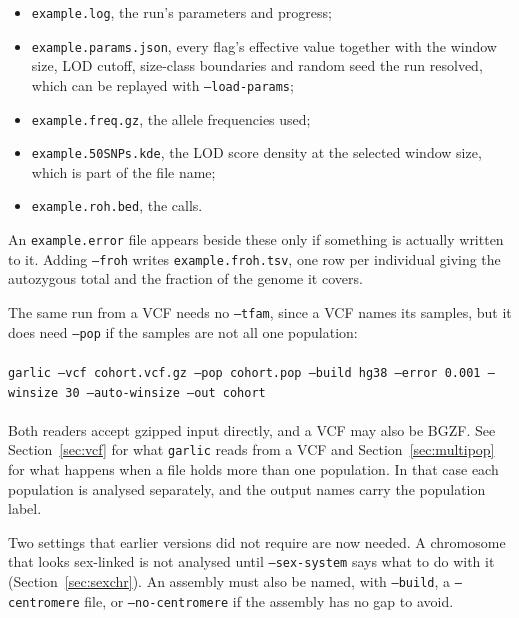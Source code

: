 \documentclass[12pt]{article}%
\begin{document}
\begin{itemize}
\item {\tt example.log}, the run's parameters and progress;
\item {\tt example.params.json}, every flag's effective value together with
      the window size, LOD cutoff, size-class boundaries and random seed the
      run resolved, which can be replayed with {\tt --load-params};
\item {\tt example.freq.gz}, the allele frequencies used;
\item {\tt example.50SNPs.kde}, the LOD score density at the selected window
      size, which is part of the file name;
\item {\tt example.roh.bed}, the calls.
\end{itemize}

\noindent An {\tt example.error} file appears beside these only if something is
actually written to it.  Adding {\tt --froh} writes {\tt example.froh.tsv}, one
row per individual giving the autozygous total and the fraction of the genome
it covers.

The same run from a VCF needs no {\tt --tfam}, since a VCF names its samples,
but it does need {\tt --pop} if the samples are not all one population:
~\\\\
{\tt garlic --vcf cohort.vcf.gz --pop cohort.pop --build hg38 --error 0.001 --winsize 30 --auto-winsize --out cohort}
~\\\\
\noindent Both readers accept gzipped input directly, and a VCF may also be
BGZF.  See Section~\ref{sec:vcf} for what {\tt garlic} reads from a VCF and
Section~\ref{sec:multipop} for what happens when a file holds more than one
population.  In that case each population is analysed separately, and the
output names carry the population label.

Two settings that earlier versions did not require are now needed.  A
chromosome that looks sex-linked is not analysed until {\tt --sex-system} says
what to do with it (Section~\ref{sec:sexchr}).  An assembly must also be
named, with {\tt --build}, a {\tt --centromere} file, or {\tt --no-centromere}
if the assembly has no gap to avoid.
\end{document}
